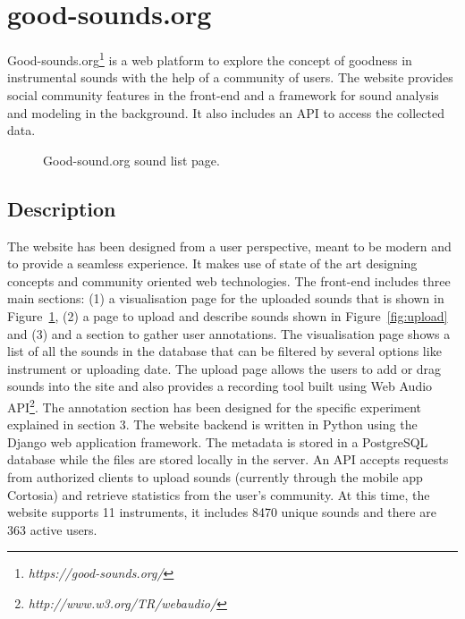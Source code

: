 \documentclass{article}
\begin{document}
\section{good-sounds.org}\label{sec:goodsounds}
Good-sounds.org\footnote{\textit{https://good-sounds.org/}} is a web platform to explore the concept of goodness in instrumental sounds with the help of a community of users. The website provides social community features in the front-end and a framework for sound analysis and modeling in the background. It also includes an API to access the collected data.

\begin{figure}[ht]
 \centerline{}
 \caption{Good-sound.org sound list page.}
 \label{fig:sound_list}
\end{figure}

\subsection{Description} 
The website has been designed from a user perspective, meant to be modern and to provide a seamless experience. It makes use of state of the art designing concepts and community oriented web technologies. The front-end includes three main sections: (1) a visualisation page for the uploaded sounds that is shown in Figure~\ref{fig:sound_list}, (2) a page to  upload and describe sounds shown in Figure~\ref{fig:upload} and (3) and a section to gather user annotations. The visualisation page shows a list of all the sounds in the database that can be filtered by several options like instrument or uploading date. The upload page allows the users to add or drag sounds into the site and also provides a recording tool built using Web Audio API\footnote{\textit{http://www.w3.org/TR/webaudio/}}. The annotation section has been designed for the specific experiment explained in section 3. 
The website backend is written in Python using the Django web application framework. The metadata is stored in a PostgreSQL database while the files are stored locally in the server. An API accepts requests from authorized clients to upload sounds (currently through the mobile app Cortosia) and retrieve statistics from the user’s community. 
At this time, the website supports 11 instruments, it includes 8470 unique sounds and there are 363 active users. 
\end{document}
